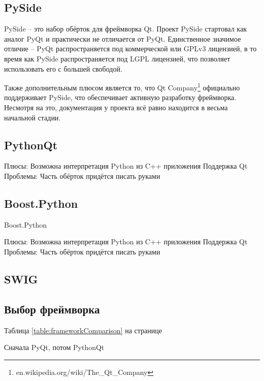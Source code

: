 \documentclass[14pt]{matmex-diploma-custom}
\begin{document}
\subsection{PySide}
PySide -- это набор обёрток для фреймворка Qt. Проект PySide стартовал как аналог PyQt и практически не отличается от PyQt. Единственное значимое отличие -- PyQt распространяется под коммерческой или GPLv3 лицензией, в то время как PySide распространяется под LGPL лицензией, что позволяет использовать его с большей свободой. 

Также дополнительным плюсом является то, что Qt Company\footnote{en.wikipedia.org/wiki/The\_Qt\_Company} официально поддерживает PySide, что обеспечивает активную разработку фреймворка. Несмотря на это, документация у проекта всё равно находится в весьма начальной стадии.

\subsection{PythonQt}
Плюсы:
Возможна интерпретация Python из C++ приложения
Поддержка Qt
Проблемы:
Часть обёрток придётся писать руками

\subsection{Boost.Python}
Boost.Python \cite{abrahams2003boost}

Плюсы:
Возможна интерпретация Python из C++ приложения
Поддержка Qt
Проблемы:
Часть обёрток придётся писать руками

\subsection{SWIG}

\subsection{Выбор фреймворка}

Таблица \ref{table:frameworkComparison} на странице \pageref{table:frameworkComparison}

Сначала PyQt, потом PythonQt
\end{document}
